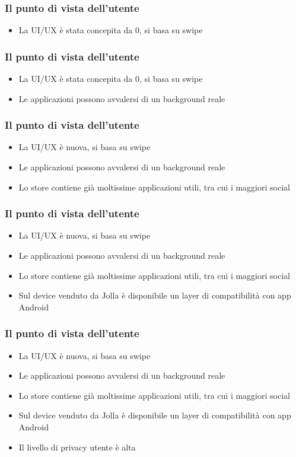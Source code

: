 \documentclass[12pt]{beamer}
\begin{document}
\begin{frame}
	\frametitle{Il punto di vista dell'utente}
	\begin{itemize}
		\item La UI/UX è stata concepita da 0, si basa su swipe
	\end{itemize}
\end{frame}

\begin{frame}
	\frametitle{Il punto di vista dell'utente}
	\begin{itemize}
		\item La UI/UX è stata concepita da 0, si basa su swipe
		\item Le applicazioni possono avvalersi di un background reale
	\end{itemize}
\end{frame}

\begin{frame}
	\frametitle{Il punto di vista dell'utente}
	\begin{itemize}
		\item La UI/UX è nuova, si basa su swipe
		\item Le applicazioni possono avvalersi di un background reale
		\item Lo store contiene già moltissime applicazioni utili, tra cui i maggiori social
	\end{itemize}
\end{frame}

\begin{frame}
	\frametitle{Il punto di vista dell'utente}
	\begin{itemize}
		\item La UI/UX è nuova, si basa su swipe
		\item Le applicazioni possono avvalersi di un background reale
		\item Lo store contiene già moltissime applicazioni utili, tra cui i maggiori social
		\item Sul device venduto da Jolla è disponibile un layer di compatibilità con app Android
	\end{itemize}
\end{frame}

\begin{frame}
	\frametitle{Il punto di vista dell'utente}
	\begin{itemize}
		\item La UI/UX è nuova, si basa su swipe
		\item Le applicazioni possono avvalersi di un background reale
		\item Lo store contiene già moltissime applicazioni utili, tra cui i maggiori social
		\item Sul device venduto da Jolla è disponibile un layer di compatibilità con app Android
		\item Il livello di privacy utente è alta
	\end{itemize}
\end{frame}
\end{document}
